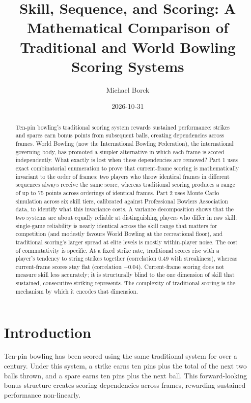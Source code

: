 \documentclass[
  letterpaper,
  DIV=11,
  numbers=noendperiod]{scrartcl}
\title{Skill, Sequence, and Scoring: A Mathematical Comparison of
Traditional and World Bowling Scoring Systems}
\author{Michael Borck}
\date{2026-10-31}
\begin{document}
\maketitle
\begin{abstract}
Ten-pin bowling's traditional scoring system rewards sustained
performance: strikes and spares earn bonus points from subsequent balls,
creating dependencies across frames. World Bowling (now the
International Bowling Federation), the international governing body, has
promoted a simpler alternative in which each frame is scored
independently. What exactly is lost when these dependencies are removed?
Part 1 uses exact combinatorial enumeration to prove that current-frame
scoring is mathematically invariant to the order of frames: two players
who throw identical frames in different sequences always receive the
same score, whereas traditional scoring produces a range of up to 75
points across orderings of identical frames. Part 2 uses Monte Carlo
simulation across six skill tiers, calibrated against Professional
Bowlers Association data, to identify what this invariance costs. A
variance decomposition shows that the two systems are about equally
reliable at distinguishing players who differ in raw skill: single-game
reliability is nearly identical across the skill range that matters for
competition (and modestly favours World Bowling at the recreational
floor), and traditional scoring's larger spread at elite levels is
mostly within-player noise. The cost of commutativity is specific. At a
fixed strike rate, traditional scores rise with a player's tendency to
string strikes together (correlation 0.49 with streakiness), whereas
current-frame scores stay flat (correlation −0.04). Current-frame
scoring does not measure skill less accurately; it is structurally blind
to the one dimension of skill that sustained, consecutive striking
represents. The complexity of traditional scoring is the mechanism by
which it encodes that dimension.
\end{abstract}


\section{Introduction}\label{introduction}

Ten-pin bowling has been scored using the same traditional system for
over a century. Under this system, a strike earns ten pins plus the
total of the next two balls thrown, and a spare earns ten pins plus the
next ball. This forward-looking bonus structure creates scoring
dependencies across frames, rewarding sustained performance
non-linearly.
\end{document}
